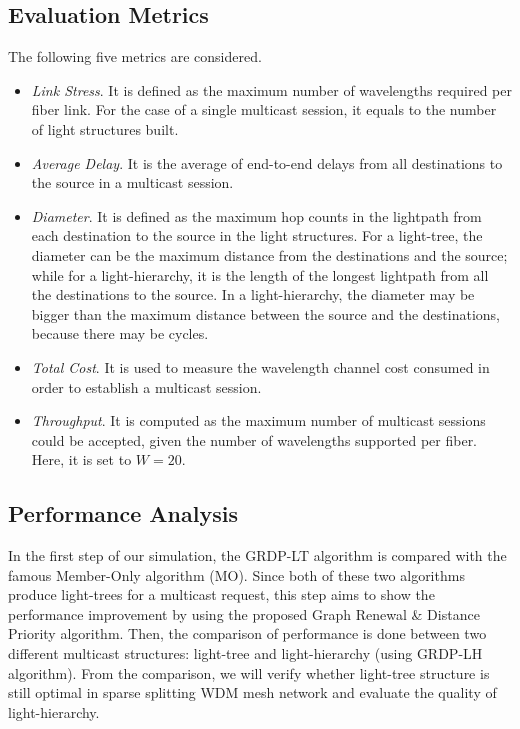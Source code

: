 \documentclass[conference]{IEEEtran}
\begin{document}
\subsection{Evaluation Metrics}
\label{subsec: Evaluation Metrics}
The following five metrics are considered.
\begin{itemize}
  \item \emph{Link Stress}. It is defined as the maximum number of wavelengths required per fiber link. For the case of a single multicast session, it equals to the number of light structures built.


  \item \emph{Average Delay}.  It is the average of end-to-end delays from all destinations to the source in a multicast session.



  \item \emph{Diameter}. It is defined as the maximum hop counts in the lightpath from each destination to the source in the light structures. For a light-tree, the diameter can be the maximum distance from the destinations and the source; while for a light-hierarchy, it is the length of the longest lightpath from all the destinations to the source. In a light-hierarchy, the diameter may be bigger than the maximum distance between the source and the destinations, because there may be cycles.



  \item \emph{Total Cost}. It is used to measure the wavelength channel cost consumed in order to establish a multicast session.



  \item \emph{Throughput}. It is computed as the maximum number of multicast sessions could be accepted, given the number of wavelengths supported per fiber. Here, it is set to $W = 20$.
\end{itemize}

\subsection{Performance Analysis}
\label{subsec: Performance Analysis}
In the first step of our simulation, the GRDP-LT algorithm is compared with the famous Member-Only algorithm (MO). Since both of these two algorithms produce light-trees for a multicast request, this step aims to show the performance improvement by using the proposed Graph Renewal \& Distance Priority algorithm. Then, the comparison of performance is done between two different multicast structures: light-tree and light-hierarchy (using GRDP-LH algorithm). From the comparison, we will verify whether light-tree structure is still optimal in sparse splitting WDM mesh network and evaluate the quality of light-hierarchy.
\end{document}
